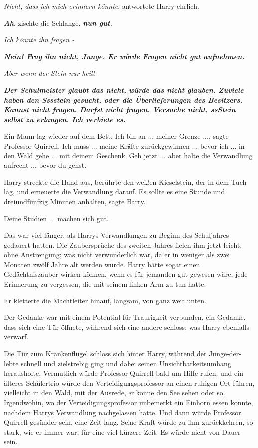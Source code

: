 \glqq{}\emph{Nicht, dass ich mich erinnern könnte}\grqq{}, antwortete Harry
ehrlich.

\glqq{}\textbf{\emph{Ah}}\grqq{}, zischte die Schlange. \glqq{}\textbf{\emph{nun
gut.}}\grqq{}

\glqq{}\emph{Ich könnte ihn fragen -}\grqq{}

\glqq{}\textbf{\emph{Nein! Frag ihn nicht, Junge. Er würde Fragen nicht gut
aufnehmen.}}\grqq{}

\glqq{}\emph{Aber wenn der Stein nur heilt -}\grqq{}

\glqq{}\textbf{\emph{Der Schulmeister glaubt das nicht, würde das nicht glauben.
Zuviele haben den Sssstein gesucht, oder die Überlieferungen des Besitzers.
Kannst nicht fragen. Darfst nicht fragen. Versuche nicht, ssStein selbst zu
erlangen. Ich verbiete es.}}\grqq{}

Ein Mann lag wieder auf dem Bett. \glqq{}Ich bin an ... meiner Grenze ...\grqq{},
sagte Professor Quirrell. \glqq{}Ich muss ... meine Kräfte zurückgewinnen ... bevor
ich ... in den Wald gehe ... mit deinem Geschenk. Geh jetzt ... aber halte die
Verwandlung aufrecht ... bevor du gehst.\grqq{}

Harry streckte die Hand aus, berührte den weißen Kieselstein, der in dem Tuch
lag, und erneuerte die Verwandlung darauf. \glqq{}Es sollte es eine Stunde und
dreiundfünfzig Minuten anhalten\grqq{}, sagte Harry.

\glqq{}Deine Studien ... machen sich gut.\grqq{}

Das war viel länger, als Harrys Verwandlungen zu Beginn des Schuljahres gedauert
hatten. Die Zaubersprüche des zweiten Jahres fielen ihm jetzt leicht, ohne
Anstrengung; was nicht verwunderlich war, da er in weniger als zwei Monaten
zwölf Jahre alt werden würde. Harry hätte sogar einen Gedächtniszauber wirken
können, wenn es für jemanden gut gewesen wäre, jede Erinnerung zu vergessen, die
mit seinem linken Arm zu tun hatte.

Er kletterte die Machtleiter hinauf, langsam, von ganz weit unten.

Der Gedanke war mit einem Potential für Traurigkeit verbunden, ein Gedanke, dass
sich eine Tür öffnete, während sich eine andere schloss; was Harry ebenfalls
verwarf.

Die Tür zum Krankenflügel schloss sich hinter Harry, während der Junge-der-lebte
schnell und zielstrebig ging und dabei seinen Unsichtbarkeitsumhang herausholte.
Vermutlich würde Professor Quirrell bald um Hilfe rufen; und ein älteres
Schülertrio würde den Verteidigungsprofessor an einen ruhigen Ort führen,
vielleicht in den Wald, mit der Ausrede, er könne den See sehen oder so.
Irgendwohin, wo der Verteidigungsprofessor unbemerkt ein Einhorn essen konnte,
nachdem Harrys Verwandlung nachgelassen hatte. Und dann würde Professor Quirrell
gesünder sein, eine Zeit lang. Seine Kraft würde zu ihm zurückkehren, so stark,
wie er immer war, für eine viel kürzere Zeit. Es würde nicht von Dauer sein.

